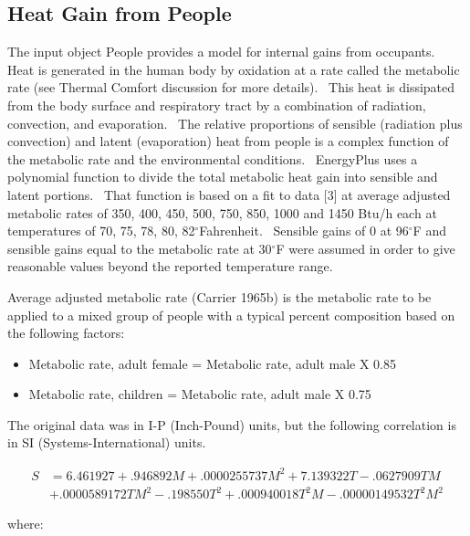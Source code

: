 \subsection{Heat Gain from People}\label{heat-gain-from-people-000}

The input object People provides a model for internal gains from occupants.~ Heat is generated in the human body by oxidation at a rate called the metabolic rate (see Thermal Comfort discussion for more details).~ This heat is dissipated from the body surface and respiratory tract by a combination of radiation, convection, and evaporation.~ The relative proportions of sensible (radiation plus convection) and latent (evaporation) heat from people is a complex function of the metabolic rate and the environmental conditions.~ EnergyPlus uses a polynomial function to divide the total metabolic heat gain into sensible and latent portions.~ That function is based on a fit to data {[}3{]} at average adjusted metabolic rates of 350, 400, 450, 500, 750, 850, 1000 and 1450 Btu/h each at temperatures of 70, 75, 78, 80, 82\(^{\circ}\)Fahrenheit.~ Sensible gains of 0 at 96\(^{\circ}\)F and sensible gains equal to the metabolic rate at 30\(^{\circ}\)F were assumed in order to give reasonable values beyond the reported temperature range.

Average adjusted metabolic rate (Carrier 1965b) is the metabolic rate to be applied to a mixed group of people with a typical percent composition based on the following factors:

\begin{itemize}
  \item Metabolic rate, adult female = Metabolic rate, adult male X 0.85
  \item Metabolic rate, children = Metabolic rate, adult male X 0.75
\end{itemize}

The original data was in I-P (Inch-Pound) units, but the following correlation is in SI (Systems-International) units.

\begin{equation}
  \begin{array}{ll}
    S &= 6.461927 + .946892 M + .0000255737 M^2 + 7.139322 T - .0627909 T M \\
      &+ .0000589172 T M^2 - .198550 T^2 + .000940018 T^2 M - .00000149532 T^2 M^2
  \end{array}
\end{equation}

where:

